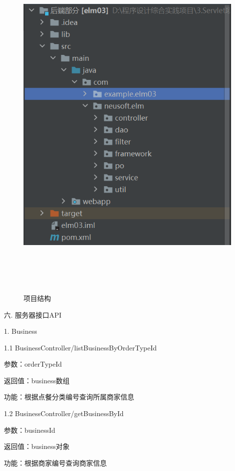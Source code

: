 \begin{figure}[H]
    \centering
    \includegraphics[width=15cm,height=18cm]{figures/structure3.png}
    \caption{项目结构}
\end{figure}

\noindent
六. 服务器接口API

1. Business

1.1 BusinessController/listBusinessByOrderTypeId 

参数：orderTypeId 

返回值：business数组

功能：根据点餐分类编号查询所属商家信息

1.2 BusinessController/getBusinessById 

参数：businessId 

返回值：business对象

功能：根据商家编号查询商家信息~\\

